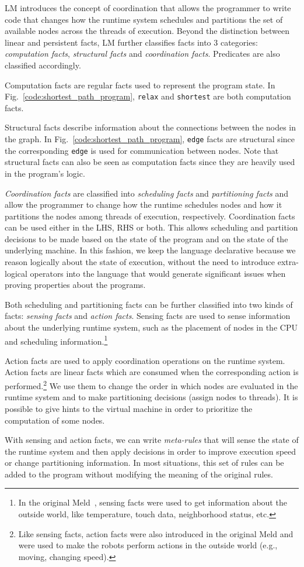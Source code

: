 LM introduces the concept of coordination that allows the programmer to write
code that changes how the runtime system schedules and partitions the set of
available nodes across the threads of execution. Beyond the distinction between
linear and persistent facts, LM further classifies facts into 3 categories:
\emph{computation facts}, \emph{structural facts} and \emph{coordination facts}.
Predicates are also classified accordingly.

Computation facts are regular facts used to represent the program state. In
Fig.~\ref{code:shortest_path_program}, \texttt{relax} and \texttt{shortest} are
both computation facts.

Structural facts describe information about the connections between the nodes in
the graph. In Fig.~\ref{code:shortest_path_program}, \texttt{edge} facts are
structural since the corresponding \texttt{edge} is used for communication
between nodes.  Note that structural facts can also be seen as computation facts
since they are heavily used in the program's logic.

\emph{Coordination facts} are classified into \emph{scheduling facts} and
\emph{partitioning facts} and allow the programmer to change how the runtime
schedules nodes and how it partitions the nodes among threads of execution,
respectively. Coordination facts can be used either in the LHS, RHS or both.
This allows scheduling and partition decisions to be made based on the state of
the program and on the state of the underlying machine.  In this fashion, we
keep the language declarative because we reason logically about the state of
execution, without the need to introduce extra-logical operators into the
language that would generate significant issues when proving properties about
the programs.

Both scheduling and partitioning facts can be further classified into two kinds
of facts: \emph{sensing facts} and \emph{action facts}. Sensing facts are used
to sense information about the underlying runtime system, such as the placement
of nodes in the CPU and scheduling information.\footnote{In the original
   Meld~\cite{ashley-rollman-iclp09}, sensing facts were used to get information
about the outside world, like temperature, touch data, neighborhood status,
etc.}

Action facts are used to apply coordination operations on the runtime system.
Action facts are linear facts which are consumed when the corresponding action
is performed.\footnote{Like sensing facts, action facts were also introduced in the
original Meld and were used to make the robots perform actions in the outside
world (e.g., moving, changing speed).} We use them to change the order in
which nodes are evaluated in the runtime system and to make partitioning
decisions (assign nodes to threads). It is possible to give hints to the virtual
machine in order to prioritize the computation of some nodes.

With sensing and action facts, we can write \emph{meta-rules} that will
sense the state of the runtime system and then apply decisions in order to
improve execution speed or change partitioning information. In most situations,
this set of rules can be added to the program without modifying the meaning of
the original rules.
